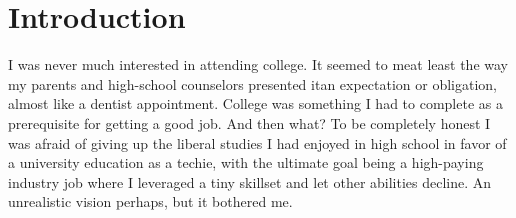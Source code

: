 \documentclass{article}
\begin{document}
\newcommand{\phd}{Ph.D.}
\newcommand{\university}{%
\texttt{<your-college-here>}
}


\newcommand{\sloc}{13.6 million lines}
\newcommand{\numprojects}{43}





\section{Introduction}
I was never much interested in attending college.
It seemed to me\textemdash at least the way my parents and high-school counselors presented it\textemdash an expectation or obligation, almost like a dentist appointment. 
College was something I had to complete as a prerequisite for getting a good job.
And then what? 
To be completely honest I was afraid of giving up the liberal studies I had enjoyed in high school in favor of a university education as a techie, with the ultimate goal being a high-paying industry job where I leveraged a tiny skillset and let other abilities decline. 
An unrealistic vision perhaps, but it bothered me. 
\end{document}
